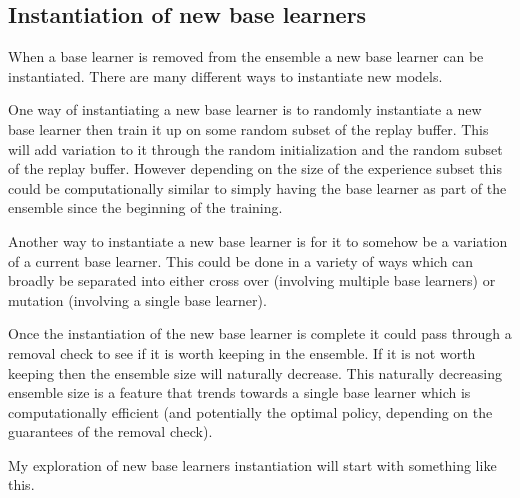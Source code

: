 \documentclass[12pt]{article}
\begin{document}
\subsection{Instantiation of new base learners}

When a base learner is removed from the ensemble a new base learner can be instantiated. There are many different ways to instantiate new models.

One way of instantiating a new base learner is to randomly instantiate a new base learner then train it up on some random subset of the replay buffer. This will add variation to it through the random initialization and the random subset of the replay buffer. However depending on the size of the experience subset this could be computationally similar to simply having the base learner as part of the ensemble since the beginning of the training.

Another way to instantiate a new base learner is for it to somehow be a variation of a current base learner. This could be done in a variety of ways which can broadly be separated into either cross over (involving multiple base learners) or mutation (involving a single base learner).

Once the instantiation of the new base learner is complete it could pass through a removal check to see if it is worth keeping in the ensemble. If it is not worth keeping then the ensemble size will naturally decrease. This naturally decreasing ensemble size is a feature that trends towards a single base learner which is computationally efficient (and potentially the optimal policy, depending on the guarantees of the removal check).

My exploration of new base learners instantiation will start with something like this.
\end{document}
